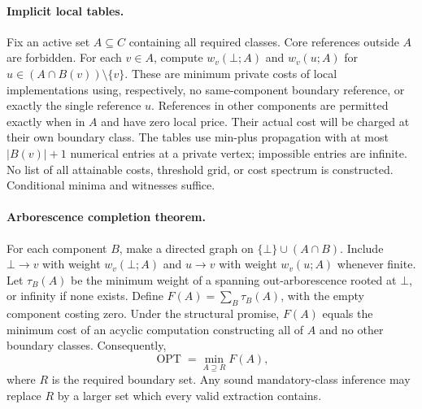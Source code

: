 \paragraph{Implicit local tables.}
Fix an active set $A\subseteq C$ containing all required classes. Core references
outside $A$ are forbidden. For each $v\in A$, compute $w_v(\bot;A)$ and
$w_v(u;A)$ for $u\in (A\cap B(v))\setminus\{v\}$. These are minimum private
costs of local implementations using, respectively, no same-component boundary
reference, or exactly the single reference $u$. References in other components
are permitted exactly when in $A$ and have zero local price. Their actual cost
will be charged at their own boundary class. The tables use min-plus propagation
with at most $|B(v)|+1$ numerical entries at a private vertex; impossible entries
are infinite. No list of all attainable costs, threshold grid, or cost spectrum
is constructed. Conditional minima and witnesses suffice.

\paragraph{Arborescence completion theorem.}
For each component $B$, make a directed graph on
$\{\bot\}\cup(A\cap B)$. Include $\bot\to v$ with weight $w_v(\bot;A)$
and $u\to v$ with weight $w_v(u;A)$ whenever finite. Let $\tau_B(A)$ be the
minimum weight of a spanning out-arborescence rooted at $\bot$, or infinity
if none exists. Define $F(A)=\sum_B\tau_B(A)$, with the empty component costing
zero. Under the structural promise, $F(A)$ equals the minimum cost of an
acyclic computation constructing all of $A$ and no other boundary classes.
Consequently,
\[
 \operatorname{OPT}=\min_{A\supseteq R}F(A),
\]
where $R$ is the required boundary set. Any sound mandatory-class inference may
replace $R$ by a larger set which every valid extraction contains.

